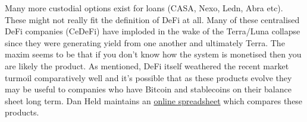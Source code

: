 Many more custodial options exist for loans (CASA, Nexo, Ledn, Abra etc). These might not really fit the definition of DeFi at all. Many of these centralised DeFi companies (CeDeFi) have imploded in the wake of the Terra/Luna collapse since they were generating yield from one another and ultimately Terra. The maxim seems to be that if you don't know how the system is monetised then you are likely the product. As mentioned, DeFi itself weathered the recent market turmoil comparatively well and it's possible that as these products evolve they may be useful to companies who have Bitcoin and stablecoins on their balance sheet long term. Dan Held maintains an \href{https://docs.google.com/spreadsheets/d/1ZoapTCl76wahFMeNISSx9UdC3QBx-zC_jY4Le1H5Sdg/htmlview#}{online spreadsheet} which compares these products.\par
